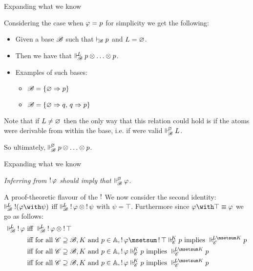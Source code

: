 \documentclass{beamer}
\begin{document}
\begin{frame}{Expanding what we know}
\begin{center}
Considering the case when $\varphi = {p}$ for simplicity we get the following:
\begin{itemize}
\pause
\item Given a base $\mathscr{B}$ such that $\vdash_{\!\!\mathscr{B}}{p}$ and $L=\varnothing$.
\pause
\item Then we have that $\Vdash_{ \!\!\mathscr{B} }^{ \!\!L }{p} \otimes \ldots \otimes {p}$.
\pause
\item Examples of such bases:
\begin{itemize}
	\item $\mathscr{B} = \{\varnothing \Rightarrow {p}\}$
	\item $\mathscr{B} = \{\varnothing \Rightarrow {q},\, {q}\Rightarrow {p} \}$
\end{itemize}
\pause
\end{itemize} 
\vspace{10pt}
Note that if $L \neq \varnothing$ then the only way that this relation could hold is if the atoms were derivable from within the base, i.e. if were valid $\Vdash_{ \!\!\mathscr{B} }^{ \!\!\varnothing }L$.

So ultimately, $\Vdash_{ \!\!\mathscr{B} }^{ \!\!\varnothing }p\otimes \ldots \otimes p$. 
\end{center}
\end{frame}
\begin{frame}{Expanding what we know}
\begin{center}
\noindent
\emph{Inferring from $\mathop{!} \varphi$ should imply that $\Vdash_{ \!\!\mathscr{B} }^{ \!\!\varnothing }\varphi$.}
\end{center}
\end{frame}
\begin{frame}{A proof-theoretic flavour of the $\mathop{!}$}
	We now consider the second identity: $\suppM{\baseB}{L}\bang(\varphi\aand\psi)$ iff $\Vdash_{ \!\!\mathscr{B} }^{ \!\!L }\mathop{!}\varphi \otimes \mathop{!}\psi$
	with $\psi = \top$. Furthermore since $\varphi\aand\top \equiv \varphi$ we go as follows:
	\begin{align}
		\suppM{\baseB}{L}\bang\varphi &\text{ iff } \suppM{\baseB}{L}\bang\varphi \mand \bang\top \\
		&\text{ iff for all } \baseC\baseGeq\baseB, K \text{ and } p\in\At,\bang\varphi\msetsum\bang\top\suppM{\baseC}{K}p\text{ implies }\suppM{\baseC}{L\msetsum K}p\\
		&\text{ iff for all } \baseC\baseGeq\baseB, K \text{ and } p\in\At,\bang\varphi\suppM{\baseC}{K}p\text{ implies }\suppM{\baseC}{L\msetsum K}p\\
		&\text{ iff for all } \baseC\baseGeq\baseB, K \text{ and } p\in\At,\bang\varphi\suppM{\baseC}{K}p\text{ implies }\suppM{\baseC}{L\msetsum K}p
	\end{align}
\end{frame}
\end{document}
